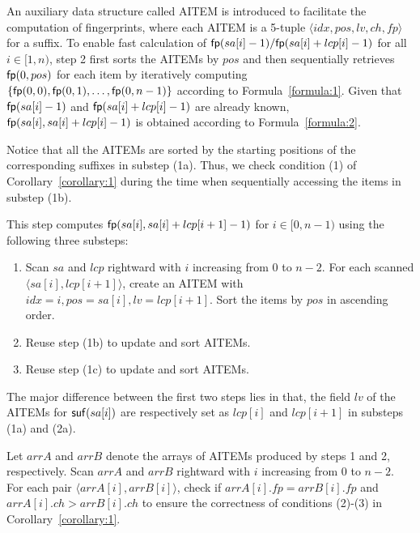 \documentclass[10pt,journal,compsoc]{IEEEtran}
\begin{document}
	An auxiliary data structure called AITEM is introduced to facilitate the computation of fingerprints, where each AITEM is a 5-tuple $\langle idx, pos, lv, ch, fp\rangle$ for a suffix. To enable fast calculation of ${\sf fp}(sa[i] - 1)/{\sf fp}(sa[i] + lcp[i] - 1)$ for all $i \in [1, n)$, step 2 first sorts the AITEMs by $pos$ and then sequentially retrieves ${\sf fp}(0, pos)$ for each item by iteratively computing $\{{\sf fp}(0, 0), {\sf fp}(0, 1), \dots, {\sf fp}(0, n - 1) \}$ according to Formula~\ref{formula:1}. Given that ${\sf fp}(sa[i] - 1)$ and ${\sf fp}(sa[i] + lcp[i] - 1)$ are already known, ${\sf fp}(sa[i], sa[i] + lcp[i] - 1)$ is obtained according to Formula~\ref{formula:2}.

	Notice that all the AITEMs are sorted by the starting positions of the corresponding suffixes in substep (1a). Thus, we check condition (1) of Corollary~\ref{corollary:1} during the time when sequentially accessing the items in substep (1b).
	
	\vspace{1ex}  This step computes ${\sf fp}(sa[i], sa[i] + lcp[i + 1] - 1)$ for $i \in [0, n - 1)$ using the following three substeps:
	
	\begin{enumerate}
		
		\item [(2a)]
		Scan $sa$ and $lcp$ rightward with $i$ increasing from $0$ to $n - 2$. For each scanned $\langle sa[i], lcp[i + 1] \rangle$, create an AITEM with $idx = i, pos = sa[i], lv = lcp[i + 1]$. Sort the items by $pos$ in ascending order.
		
		\item [(2b)]
		Reuse step (1b) to update and sort AITEMs.
		
		\item [(2c)]
		Reuse step (1c) to update and sort AITEMs.
		
	\end{enumerate}
	
	The major difference between the first two steps lies in that, the field $lv$ of the AITEMs for ${\sf suf}(sa[i])$ are respectively set as $lcp[i]$ and $lcp[i + 1]$ in substeps (1a) and (2a).
	
	
	\vspace{1ex}  Let $arrA$ and $arrB$ denote the arrays of AITEMs produced by steps 1 and 2, respectively. Scan $arrA$ and $arrB$ rightward with $i$ increasing from $0$ to $n - 2$. For each pair $\langle arrA[i], arrB[i]\rangle$, check if $arrA[i].fp = arrB[i].fp$ and $arrA[i].ch > arrB[i].ch$ to ensure the correctness of conditions (2)-(3) in Corollary~\ref{corollary:1}.
	
\end{document}
